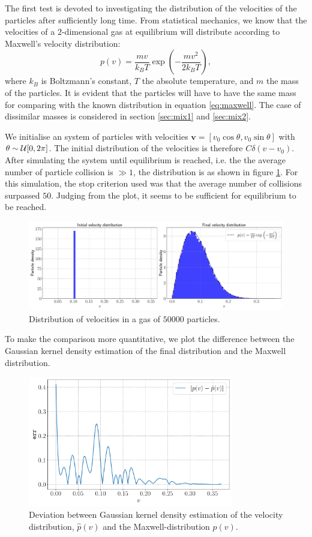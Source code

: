The first test is devoted to investigating the distribution of the velocities of the particles after sufficiently long time. From statistical mechanics, we know that the velocities of a $2$-dimensional gas at equilibrium will distribute according to Maxwell's velocity distribution: 
\begin{equation}\label{eq:maxwell}
	p(v) = \frac{mv}{k_B T} \exp{\left(- \frac{mv^2}{2 k_B T}\right)},
\end{equation}
where $k_B$ is Boltzmann's constant, $T$ the absolute temperature, and $m$ the mass of the particles. It is evident that the particles will have to have the same mass for comparing with the known distribution in equation \ref{eq:maxwell}. The case of dissimilar masses is considered in section \ref{sec:mix1} and \ref{sec:mix2}.

We initialise an system of particles with velocities $\mathbf{v} = [v_0 \cos{\theta} , v_0 \sin{\theta}]$ with $\theta \sim \mathcal{U}[0,2\pi]$. The initial distribution of the velocities is therefore $C\delta (v - v_0)$. After simulating the system until equilibrium is reached, i.e. the the average number of particle collision is $\gg 1$, the distribution is as shown in figure \ref{fig:dist_1}. For this simulation, the stop criterion used was that the average number of collisions surpassed $50$. Judging from the plot, it seems to be sufficient for equilibrium to be reached. 

\begin{figure}[htb]
	\centering
	\includegraphics[width=\textwidth]{../fig/distribution}
	\caption{Distribution of velocities in a gas of $50000$ particles.}
	\label{fig:dist_1}
\end{figure}

To make the comparison more quantitative, we plot the difference between the Gaussian kernel density estimation of the final distribution and the Maxwell distribution. 

\begin{figure}[htb]
	\centering
	\includegraphics[width=0.8\textwidth]{../fig/kde_diff}
	\caption{Deviation between Gaussian kernel density estimation of the velocity distribution, $\hat{p}(v)$ and the Maxwell-distribution $p(v)$.}
	\label{fig:dist_2}
\end{figure}